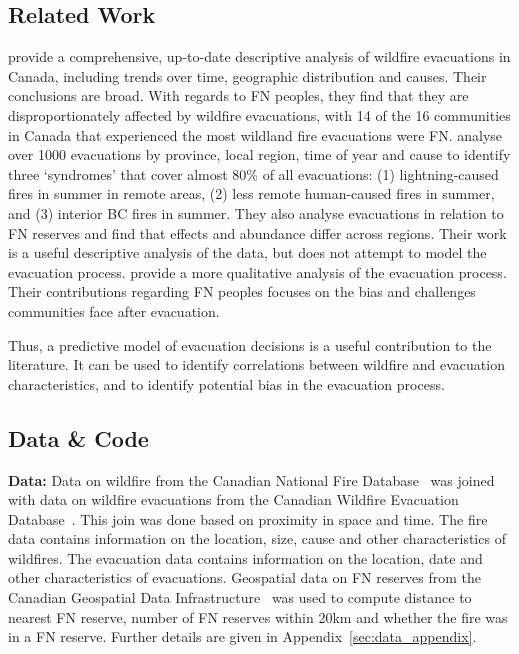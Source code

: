 \subsection{Related Work}\label{sec:related_work}

\cite{wildfire_evacs} provide a comprehensive, up-to-date descriptive analysis of wildfire evacuations in Canada, including trends over time, geographic distribution and causes. Their conclusions are broad. With regards to FN peoples, they find that they are disproportionately affected by wildfire evacuations, with 14 of the 16 communities in Canada that experienced the most wildland fire evacuations were FN. \cite{wildfire_syndromes} analyse over 1000 evacuations by province, local region, time of year and cause to identify three `syndromes' that cover almost 80\% of all evacuations: (1) lightning-caused fires in summer in remote areas, (2) less remote human-caused fires in summer, and (3) interior BC fires in summer. They also analyse evacuations in relation to FN reserves and find that effects and abundance differ across regions. Their work is a useful descriptive analysis of the data, but does not attempt to model the evacuation process. \cite{wildfire_management_evacuation_review} provide a more qualitative analysis of the evacuation process. Their contributions regarding FN peoples focuses on the bias and challenges communities face after evacuation.

Thus, a predictive model of evacuation decisions is a useful contribution to the literature. It can be used to identify correlations between wildfire and evacuation characteristics, and to identify potential bias in the evacuation process.

\subsection{Data \& Code}\label{sec:data}

\textbf{Data:} Data on wildfire from the Canadian National Fire Database~\cite{cnfdb} was joined with data on wildfire evacuations from the Canadian Wildfire Evacuation Database~\cite{evacdb}. This join was done based on proximity in space and time. The fire data contains information on the location, size, cause and other characteristics of wildfires. The evacuation data contains information on the location, date and other characteristics of evacuations. Geospatial data on FN reserves from the Canadian Geospatial Data Infrastructure~\cite{reservesdb} was used to compute distance to nearest FN reserve, number of FN reserves within 20km and whether the fire was in a FN reserve. Further details are given in Appendix~\ref{sec:data_appendix}.

